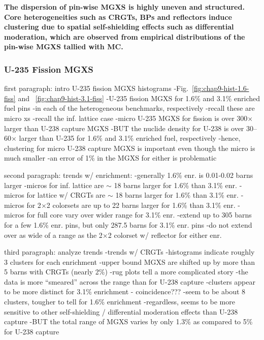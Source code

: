 
\begin{emphbox}
\textbf{The dispersion of pin-wise \ac{MGXS} is highly uneven and structured. Core heterogeneities such as \acp{CRGT}, \acp{BP} and reflectors induce clustering due to spatial self-shielding effects such as differential moderation, which are observed from empirical distributions of the pin-wise \ac{MGXS} tallied with \ac{MC}.}
\end{emphbox}

\subsubsection{U-235 Fission MGXS}
\label{subsubsec:chap9-histograms-fiss}

first paragraph: intro U-235 fission \ac{MGXS} histograms
-Fig.~\ref{fig:chap9-hist-1.6-fiss} and ~\ref{fig:chap9-hist-3.1-fiss}
  -U-235 fission \ac{MGXS} for 1.6\% and 3.1\% enriched fuel pins
  -in each of the heterogeneous benchmarks, respectively
-recall these are micro xs
-recall the inf. lattice case
-micro U-235 \ac{MGXS} for fission is over 300$\times$ larger than U-238 capture \ac{MGXS}
  -BUT the nuclide density for U-238 is over 30--60$\times$ larger than U-235 for 1.6\% and 3.1\% enriched fuel, respectively
  -hence, clustering for micro U-238 capture \ac{MGXS} is important even though the micro is much smaller
  -an error of 1\% in the \ac{MGXS} for either is problematic

second paragraph: trends w/ enrichment:
-generally 1.6\% enr. is 0.01-0.02 barns larger
  -micros for inf. lattice are $\sim$ 18 barns larger for 1.6\% than 3.1\% enr.
  -micros for lattice w/ \acp{CRGT} are $\sim$ 18 barns larger for 1.6\% than 3.1\% enr.
  -micros for 2$\times$2 colorsets are up to 22 barns larger for 1.6\% than 3.1\% enr.
  -micros for full core vary over wider range for 3.1\% enr.
    -extend up to 305 barns for a few 1.6\% enr. pins, but only 287.5 barns for 3.1\% enr. pins
    -do not extend over as wide of a range as the 2$\times$2 colorset w/ reflector for either enr.

third paragraph: analyze trends
-trends w/ \acp{CRGT}
  -histograms indicate roughly 3 clusters for each enrichment
  -upper bound \ac{MGXS} are shifted up by more than 5 barns with \acp{CRGT} (nearly 2\%)
  -rug plots tell a more complicated story
    -the data is more ``smeared'' across the range than for U-238 capture
    -clusters appear to be more distinct for 3.1\% enrichment - coincidence???
      -seem to be about 8 clusters, tougher to tell for 1.6\% enrichment
      -regardless, seems to be more sensitive to other self-shielding / differential moderation effects than U-238 capture
        -BUT the total range of MGXS varies by only 1.3\% as compared to 5\% for U-238 capture

